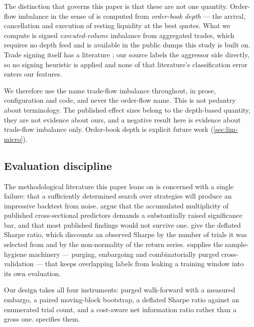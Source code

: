 The distinction that governs this paper is that these are not one quantity. Order-flow imbalance
in the sense of \citet{cont2014ofi} is computed from \emph{order-book depth} --- the arrival,
cancellation and execution of resting liquidity at the best quotes. What we compute is signed
\emph{executed-volume} imbalance from aggregated trades, which requires no depth feed and is
available in the public dumps this study is built on. Trade signing itself has a literature
\citep{lee1991trade}; our source labels the aggressor side directly, so no signing heuristic is
applied and none of that literature's classification error enters our features.

We therefore use the name trade-flow imbalance throughout, in prose, configuration and code, and
never the order-flow name. This is not pedantry about terminology. The published effect sizes
belong to the depth-based quantity, they are not evidence about ours, and a negative result here
is evidence about trade-flow imbalance only. Order-book depth is explicit future work
(\cref{sec:lim-micro}).

\subsection{Evaluation discipline}
\label{sec:rel-eval}

The methodological literature this paper leans on is concerned with a single failure: that a
sufficiently determined search over strategies will produce an impressive backtest from noise.
\citet{harvey2016crosssection} argue that the accumulated multiplicity of published cross-sectional
predictors demands a substantially raised significance bar, and that most published findings would
not survive one. \citet{bailey2014dsr} give the deflated Sharpe ratio, which discounts an observed
Sharpe by the number of trials it was selected from and by the non-normality of the return series.
\citet{lopezdeprado2018advances} supplies the sample-hygiene machinery --- purging, embargoing and
combinatorially purged cross-validation --- that keeps overlapping labels from leaking a training
window into its own evaluation.

Our design takes all four instruments: purged walk-forward with a measured embargo, a paired
moving-block bootstrap, a deflated Sharpe ratio against an enumerated trial count, and a
cost-aware net information ratio rather than a gross one.  specifies them.

